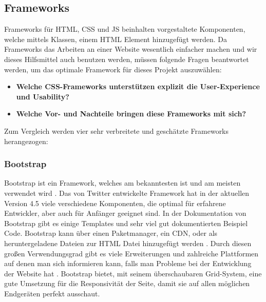 	
	
	\subsection{Frameworks}
	Frameworks für HTML, CSS und JS beinhalten vorgestaltete Komponenten, welche mittels Klassen, einem HTML Element hinzugefügt werden. Da Frameworks das Arbeiten an einer Website wesentlich einfacher machen und wir dieses Hilfsmittel auch benutzen werden, müssen folgende Fragen beantwortet werden, um das optimale Framework für dieses Projekt auszuwählen:
	\begin{itemize}
		\item \textbf{Welche CSS-Frameworks unterstützen explizit die User-Experience und Usability?}
		\item \textbf{Welche Vor- und Nachteile bringen diese Frameworks mit sich?}
	\end{itemize}
	Zum Vergleich werden vier sehr verbreitete und geschätzte Frameworks herangezogen:
		\subsubsection{Bootstrap}
		Bootstrap ist ein Framework, welches am bekanntesten ist und am meisten verwendet wird \cite{introduction-bootstrap, learning-bootstrap}. Das von Twitter entwickelte Framework hat in der aktuellen Version 4.5 viele verschiedene Komponenten, die optimal für erfahrene Entwickler, aber auch für Anfänger geeignet sind. In der Dokumentation von Bootstrap gibt es einige Templates und sehr viel gut dokumentierten Beispiel Code\cite{introduction-bootstrap}. Bootstrap kann über einen Paketmanager, ein CDN, oder als heruntergeladene Dateien zur HTML Datei hinzugefügt werden \cite{bootstrap-docu}. Durch diesen großen Verwendungsgrad gibt es viele Erweiterungen und zahlreiche Plattformen auf denen man sich informieren kann, falls man Probleme bei der Entwicklung der Website hat \cite{learning-bootstrap}. Bootstrap bietet, mit seinem überschaubaren Grid-System, eine gute Umsetzung für die Responsivität der Seite, damit sie auf allen möglichen Endgeräten perfekt ausschaut.

